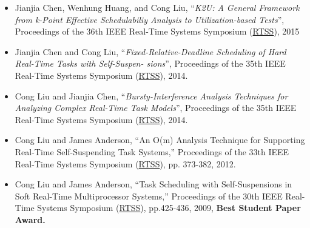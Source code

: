 \documentclass[10pt,letterpaper]{article}
\begin{document}
	\begin{itemize}
	




\item
Jianjia Chen, Wenhung Huang, and Cong Liu, ``\textit{K2U: A General Framework from k-Point Effective Schedulabiliy Analysis to Utilization-based Tests}'', Proceedings of the 36th IEEE Real-Time Systems Symposium (\underline{RTSS}), 2015

\item
Jianjia Chen and Cong Liu, ``\textit{Fixed-Relative-Deadline Scheduling of Hard Real-Time Tasks with Self-Suspen- sions}'', Proceedings of the 35th IEEE Real-Time Systems Symposium (\underline{RTSS}), 2014.


\item 
Cong Liu and Jianjia Chen, ``\textit{Bursty-Interference Analysis Techniques for Analyzing Complex Real-Time Task Models}'', Proceedings of the 35th IEEE Real-Time Systems Symposium (\underline{RTSS}), 2014.

\vspace{-2mm}
\item 	Cong Liu and James Anderson, ``An O(m) Analysis Technique for Supporting Real-Time Self-Suspending Task Systems,'' Proceedings of the 33th IEEE Real-Time Systems Symposium (\underline{RTSS}), pp. 373-382, 2012.


\vspace{-2mm}
\item Cong Liu and James Anderson, ``Task Scheduling with Self-Suspensions in Soft Real-Time Multiprocessor Systems,'' Proceedings of the 30th IEEE Real-Time Systems Symposium (\underline{RTSS}), pp.425-436, 2009,  \textbf{Best Student Paper Award.}

\end{itemize}
	
\end{document}
